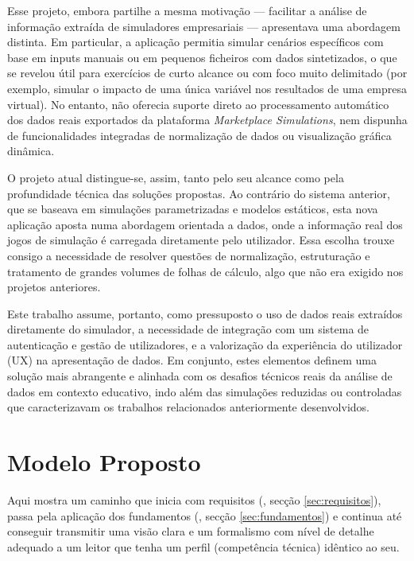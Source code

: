 Esse projeto, embora partilhe a mesma motivação — facilitar a análise de informação extraída de simuladores empresariais — apresentava uma abordagem distinta. Em particular, a aplicação permitia simular cenários específicos com base em inputs manuais ou em pequenos ficheiros com dados sintetizados, o que se revelou útil para exercícios de curto alcance ou com foco muito delimitado (por exemplo, simular o impacto de uma única variável nos resultados de uma empresa virtual). No entanto, não oferecia suporte direto ao processamento automático dos dados reais exportados da plataforma \textit{Marketplace Simulations}, nem dispunha de funcionalidades integradas de normalização de dados ou visualização gráfica dinâmica.

O projeto atual distingue-se, assim, tanto pelo seu alcance como pela profundidade técnica das soluções propostas. Ao contrário do sistema anterior, que se baseava em simulações parametrizadas e modelos estáticos, esta nova aplicação aposta numa abordagem orientada a dados, onde a informação real dos jogos de simulação é carregada diretamente pelo utilizador. Essa escolha trouxe consigo a necessidade de resolver questões de normalização, estruturação e tratamento de grandes volumes de folhas de cálculo, algo que não era exigido nos projetos anteriores.

Este trabalho assume, portanto, como pressuposto o uso de dados reais extraídos diretamente do simulador, a necessidade de integração com um sistema de autenticação e gestão de utilizadores, e a valorização da experiência do utilizador (UX) na apresentação de dados. Em conjunto, estes elementos definem uma solução mais abrangente e alinhada com os desafios técnicos reais da análise de dados em contexto educativo, indo além das simulações reduzidas ou controladas que caracterizavam os trabalhos relacionados anteriormente desenvolvidos.


\chapter{Modelo Proposto}
\label{ch:modeloProposto}

Aqui mostra um caminho que inicia com requisitos (\cf, secção \ref{sec:requisitos}), passa pela aplicação dos fundamentos (\cf, secção \ref{sec:fundamentos}) e continua até conseguir transmitir uma visão clara e um formalismo com nível de detalhe adequado a um leitor que tenha um perfil (competência técnica) idêntico ao seu.

